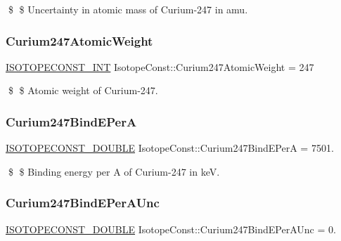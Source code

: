 \$ \$ Uncertainty in atomic mass of Curium-\/247 in amu. \mbox{\label{group___isotope_const-_curium-_cm247_gabf3b7846549504afee442a0adc8b508f}} 
\subsubsection{\texorpdfstring{Curium247\+Atomic\+Weight}{Curium247AtomicWeight}}
{\footnotesize\ttfamily \mbox{\hyperlink{group___isotope_const-_macros_ga5f18360b3e99483a35c32d789e62621c}{I\+S\+O\+T\+O\+P\+E\+C\+O\+N\+S\+T\+\_\+\+I\+NT}} Isotope\+Const\+::\+Curium247\+Atomic\+Weight = 247}

\$ \$ Atomic weight of Curium-\/247. \mbox{\label{group___isotope_const-_curium-_cm247_gaef19e178de4c9e34838d69b50c7deb3d}} 
\subsubsection{\texorpdfstring{Curium247\+Bind\+E\+PerA}{Curium247BindEPerA}}
{\footnotesize\ttfamily \mbox{\hyperlink{group___isotope_const-_macros_ga8f45a7272ce02c0b4c65c44636ed719a}{I\+S\+O\+T\+O\+P\+E\+C\+O\+N\+S\+T\+\_\+\+D\+O\+U\+B\+LE}} Isotope\+Const\+::\+Curium247\+Bind\+E\+PerA = 7501.}

\$ \$ Binding energy per A of Curium-\/247 in keV. \mbox{\label{group___isotope_const-_curium-_cm247_ga7d92c11ccd13194234196e9eb5c514e9}} 
\subsubsection{\texorpdfstring{Curium247\+Bind\+E\+Per\+A\+Unc}{Curium247BindEPerAUnc}}
{\footnotesize\ttfamily \mbox{\hyperlink{group___isotope_const-_macros_ga8f45a7272ce02c0b4c65c44636ed719a}{I\+S\+O\+T\+O\+P\+E\+C\+O\+N\+S\+T\+\_\+\+D\+O\+U\+B\+LE}} Isotope\+Const\+::\+Curium247\+Bind\+E\+Per\+A\+Unc = 0.}

